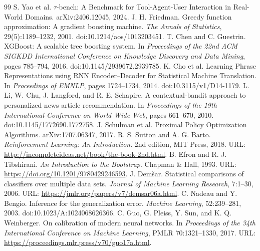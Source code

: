 \documentclass[11pt]{article}
\begin{document}
\begin{thebibliography}{99}
 S. Yao et al. $\tau$-bench: A Benchmark for Tool-Agent-User Interaction in Real-World Domains. arXiv:2406.12045, 2024.
 J. H. Friedman. Greedy function approximation: A gradient boosting machine. \emph{The Annals of Statistics}, 29(5):1189--1232, 2001. doi:10.1214/aos/1013203451.
 T. Chen and C. Guestrin. XGBoost: A scalable tree boosting system. In \emph{Proceedings of the 22nd ACM SIGKDD International Conference on Knowledge Discovery and Data Mining}, pages 785--794, 2016. doi:10.1145/2939672.2939785.
 K. Cho et al. Learning Phrase Representations using RNN Encoder--Decoder for Statistical Machine Translation. In \emph{Proceedings of EMNLP}, pages 1724--1734, 2014. doi:10.3115/v1/D14-1179.
 L. Li, W. Chu, J. Langford, and R. E. Schapire. A contextual-bandit approach to personalized news article recommendation. In \emph{Proceedings of the 19th International Conference on World Wide Web}, pages 661--670, 2010. doi:10.1145/1772690.1772758.
 J. Schulman et al. Proximal Policy Optimization Algorithms. arXiv:1707.06347, 2017.
 R. S. Sutton and A. G. Barto. \emph{Reinforcement Learning: An Introduction}. 2nd edition, MIT Press, 2018. URL: \url{http://incompleteideas.net/book/the-book-2nd.html}.
 B. Efron and R. J. Tibshirani. \emph{An Introduction to the Bootstrap}. Chapman \& Hall, 1993. URL: \url{https://doi.org/10.1201/9780429246593}.
 J. Dem\v{s}ar. Statistical comparisons of classifiers over multiple data sets. \emph{Journal of Machine Learning Research}, 7:1--30, 2006. URL: \url{https://jmlr.org/papers/v7/demsar06a.html}.
 C. Nadeau and Y. Bengio. Inference for the generalization error. \emph{Machine Learning}, 52:239--281, 2003. doi:10.1023/A:1024068626366.
 C. Guo, G. Pleiss, Y. Sun, and K. Q. Weinberger. On calibration of modern neural networks. In \emph{Proceedings of the 34th International Conference on Machine Learning}, PMLR 70:1321--1330, 2017. URL: \url{https://proceedings.mlr.press/v70/guo17a.html}.
\end{thebibliography}
\end{document}
